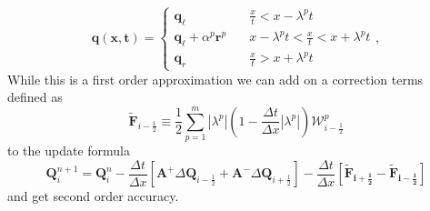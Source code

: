 \documentclass[twoside]{bsu-ms}
\begin{document}
\begin{equation}\label{eq:2.21}
\mathbf{q}(\mathbf{x},\mathbf{t})=
    \begin{cases}
     \mathbf{q}_{\ell} \quad &\frac{x}{t}<x-\lambda^{p}t\\
     \mathbf{q}_{\ell}+\alpha^{p}\mathbf{r}^{p} \quad &x-\lambda^{p}t<\frac{x}{t}<x+\lambda^{p}t\\
     \mathbf{q}_r\quad &\frac{x}{t}>x+\lambda^{p}t
    \end{cases},
\end{equation}
 While this is a first order approximation we can add on a correction terms defined as 
\begin{equation}\label{eq:2.22}
    \mathbf{\tilde{F}}_{i-\frac{1}{2}} \equiv \frac{1}{2}\sum_{p=1}^{m}|\lambda^{p}|\left(1-\frac{\Delta t}{\Delta x}|\lambda^{p}|\right)\mathbf{\mathcal{W}}_{i-\frac{1}{2}}^{p}
\end{equation}
to the update formula
\begin{equation}\label{eq:2.23}
    \mathbf{Q}_{i}^{n+1}=\mathbf{Q}_{i}^{n}-\frac{\Delta t}{\Delta x}\left[\mathbf{A}^{+}\Delta \mathbf{Q}_{i-\frac{1}{2}}+\mathbf{A}^{-}\Delta \mathbf{Q}_{i+\frac{1}{2}}\right]-\frac{\Delta t}{\Delta x}\left[\mathbf{\tilde{F}_{i+\frac{1}{2}}}-\mathbf{\tilde{F}_{i-\frac{1}{2}}}\right]
\end{equation} 
and get second order accuracy.
\end{document}
